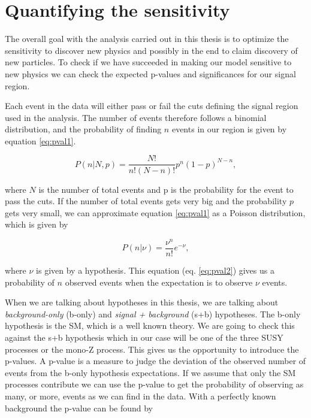 \section{Quantifying the sensitivity}
\label{sec:significance}

The overall goal with the analysis carried out in this thesis is to optimize the sensitivity to discover new physics and possibly in the end to claim discovery of new particles. To check if we have succeeded in making our model sensitive to new physics we can check the expected p-values and significances for our signal region. 

Each event in the data will either pass or fail the cuts defining the signal region used in the analysis. The number of events therefore follows a binomial distribution, and the probability of finding $n$ events in our region is given by equation \ref{eq:pval1}. 

\begin{equation}
    \label{eq:pval1}
    P(n|N, p) = \frac{N!}{n!(N-n)!} p^n(1-p)^{N-n},
\end{equation}

where $N$ is the number of total events and p is the probability for the event to pass the cuts. If the number of total events gets very big and the probability $p$ gets very small, we can approximate equation \ref{eq:pval1} as a Poisson distribution, which is given by

\begin{equation}
    \label{eq:pval2}
    P(n|\nu) = \frac{\nu^n}{n!} e^{-\nu},
\end{equation}

where $\nu$ is given by a hypothesis. This equation (eq. \ref{eq:pval2}) gives us a probability of $n$ observed events when the expectation is to observe $\nu$ events. 

When we are talking about hypotheses in this thesis, we are talking about \textit{background-only} (b-only) and \textit{signal + background} (s+b) hypotheses. The b-only hypothesis is the SM, which is a well known theory. We are going to check this against the s+b hypothesis which in our case will be one of the three SUSY processes or the mono-Z process. This gives us the opportunity to introduce the p-values. A p-value is a measure to judge the deviation of the observed number of events from the b-only hypothesis expectations. If we assume that only the SM processes contribute we can use the p-value to get the probability of observing as many, or more, events as we can find in the data. With a perfectly known background the p-value can be found by

